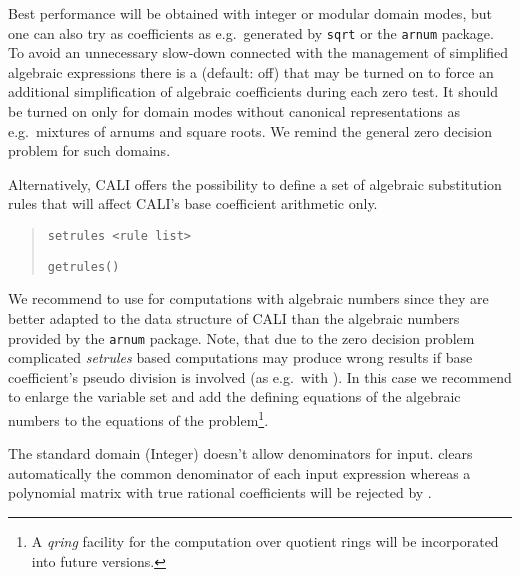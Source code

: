 Best performance will be obtained with integer or modular domain
modes, but one can also try  as coefficients
as e.g.\ generated by \texttt{sqrt} or the \texttt{arnum} package. To avoid
an unnecessary slow-down connected with the management of simplified
algebraic expressions there is a  (default:
off) that may be turned on to force an additional simplification of
algebraic coefficients during each zero test. It should be turned on
only for domain modes without canonical representations as e.g.\
mixtures of arnums and square roots. We remind the general zero
decision problem for such domains.

Alternatively, CALI offers the possibility to define a set of
algebraic substitution rules that will affect CALI's base coefficient
arithmetic only.
\begin{quote}
\verb|setrules <rule list>|


\verb|getrules()|

\end{quote}

We recommend to use  for computations with algebraic
numbers since they are better adapted to the data structure of CALI
than the algebraic numbers provided by the \texttt{arnum} package.
Note, that due to the zero decision problem
complicated \emph{setrules} based computations may produce wrong
results if base coefficient's pseudo division is involved (as e.g.\
with ). In this case we recommend to enlarge
the variable set and add the defining equations of the algebraic
numbers to the equations of the problem\footnote{A \emph{qring}
facility for the computation over quotient rings will be incorporated
into future versions.}.
\medskip

The standard domain (Integer) doesn't allow denominators for input.
 clears automatically the common denominator of each
input expression whereas a polynomial matrix with true rational
coefficients will be rejected by \ind{setmodule}.
\medskip

